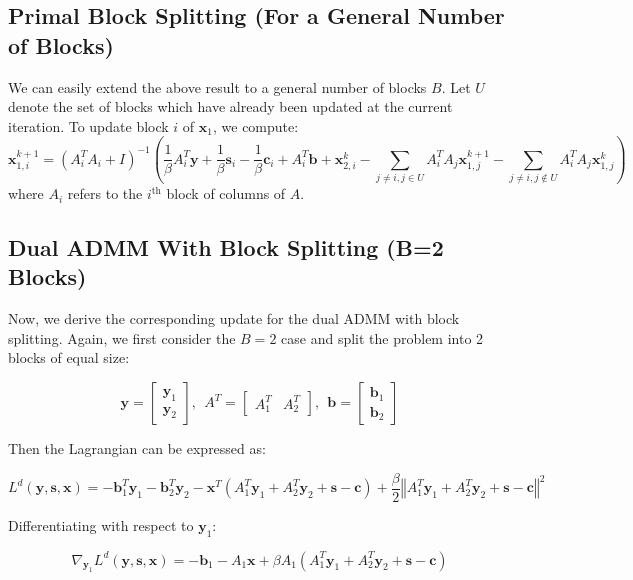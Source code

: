 \documentclass{article}
\begin{document}
\subsection*{Primal Block Splitting (For a General Number of Blocks)}

We can easily extend the above result to a general number of blocks $B$. Let $U$ denote the set of blocks which have already been updated at the current iteration. To update block $i$ of $\mathbf{x}_{1}$, we compute:
\[
\mathbf{x}_{1,i}^{k+1}=\left(A_{i}^{T}A_{i}+I\right)^{-1}\left(\frac{1}{\beta}A_{i}^{T}\mathbf{y}+\frac{1}{\beta}\mathbf{s}_{i}-\frac{1}{\beta}\mathbf{c}_{i}+A_{i}^{T}\mathbf{b}+\mathbf{x}_{2,i}^{k}-\sum_{j\neq i,j\in U}A_{i}^{T}A_{j}\mathbf{x}_{1,j}^{k+1}-\sum_{j\neq i,j\notin U}A_{i}^{T}A_{j}\mathbf{x}_{1,j}^{k}\right)
\]
where $A_{i}$ refers to the $i^{\text{th}}$ block of columns of $A$.

\vspace{0.1in}
\subsection*{Dual ADMM With Block Splitting (B=2 Blocks)}
Now, we derive the corresponding update for the dual ADMM with block splitting. Again, we first consider the $B=2$ case and split the problem into 2 blocks of equal size:

\[
\mathbf{y}=\begin{bmatrix}\mathbf{y}_{1}\\
\mathbf{y}_{2}
\end{bmatrix},
\ \
A^{T}=\begin{bmatrix}A_{1}^{T} & A_{2}^{T}\end{bmatrix},
\ \ 
\mathbf{b}=\begin{bmatrix}\mathbf{b}_{1}\\
\mathbf{b}_{2}
\end{bmatrix}
\]

Then the Lagrangian can be expressed as:

\[
L^{d}(\mathbf{y},\mathbf{s},\mathbf{x})=-\mathbf{b}_{1}^{T}\mathbf{y}_{1}-\mathbf{b}_{2}^{T}\mathbf{y}_{2}-\mathbf{x}^{T}\left(A_{1}^{T}\mathbf{y}_{1}+A_{2}^{T}\mathbf{y}_{2}+\mathbf{s}-\mathbf{c}\right)+\frac{\beta}{2}\left\Vert A_{1}^{T}\mathbf{y}_{1}+A_{2}^{T}\mathbf{y}_{2}+\mathbf{s}-\mathbf{c}\right\Vert ^{2}
\]


Differentiating with respect to $\mathbf{y}_{1}$:

\[
\nabla_{\mathbf{y}_{1}}L^{d}(\mathbf{y},\mathbf{s},\mathbf{x})=-\mathbf{b}_{1}-A_{1}\mathbf{x}+\beta A_{1}\left(A_{1}^{T}\mathbf{y}_{1}+A_{2}^{T}\mathbf{y}_{2}+\mathbf{s}-\mathbf{c}\right)
\]
\end{document}
